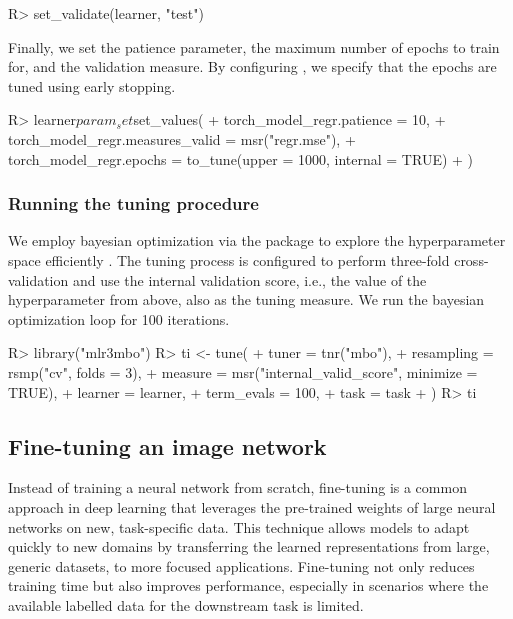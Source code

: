 \documentclass[article]{jss}
\theoremstyle{definition}
\begin{document}
\begin{CodeInput}
R> set_validate(learner, "test")
\end{CodeInput}

Finally, we set the patience parameter, the maximum number of epochs to train for, and the validation measure.
By configuring , we specify that the epochs are tuned using early stopping.

\begin{CodeInput}
R> learner$param_set$set_values(
+    torch_model_regr.patience = 10,
+    torch_model_regr.measures_valid = msr("regr.mse"),
+    torch_model_regr.epochs = to_tune(upper = 1000, internal = TRUE)
+  )
\end{CodeInput}

\subsubsection{Running the tuning procedure}

We employ bayesian optimization via the  package to explore the hyperparameter space efficiently \citep{ref-mlr3mbo}.
The tuning process is configured to perform three-fold cross-validation and use the internal validation score, i.e., the value of the  hyperparameter from above, also as the tuning measure.
We run the bayesian optimization loop for 100 iterations.

\begin{CodeInput}
R> library("mlr3mbo")
R> ti <- tune(
+    tuner = tnr("mbo"),
+    resampling = rsmp("cv", folds = 3),
+    measure = msr("internal_valid_score", minimize = TRUE),
+    learner = learner,
+    term_evals = 100,
+    task = task
+  )
R> ti
\end{CodeInput}
\begin{CodeOutput}
\end{CodeOutput}

\subsection{Fine-tuning an image network}\label{sec:finetuning}

Instead of training a neural network from scratch, fine-tuning is a common approach in deep learning that leverages the pre-trained weights of large neural networks on new, task-specific data.
This technique allows models to adapt quickly to new domains by transferring the learned representations from large, generic datasets, to more focused applications.
Fine-tuning not only reduces training time but also improves performance, especially in scenarios where the available labelled data for the downstream task is limited.
\end{document}
